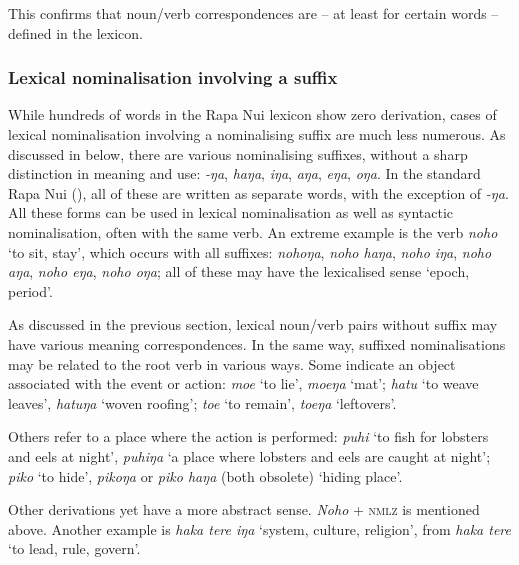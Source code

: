 This confirms that noun/verb correspondences are – at least for certain words – defined in the lexicon. 

\subsubsection[Lexical nominalisation involving a suffix]{Lexical nominalisation involving a suffix}\label{sec:3.2.2.2}
While hundreds of words in the Rapa Nui lexicon show zero derivation, cases of lexical nominalisation involving a nominalising suffix are much less numerous. As discussed in  below, there are various nominalising suffixes, without a sharp distinction in meaning and use: \textit{-ŋa}, \textit{haŋa}, \textit{iŋa}, \textit{aŋa}, \textit{eŋa}, \textit{oŋa}. In the standard Rapa Nui  (), all of these are written as separate words, with the exception of \textit{-ŋa}. All these forms can be used in lexical nominalisation as well as syntactic nominalisation, often with the same verb. An extreme example is the verb \textit{noho} ‘to sit, stay’, which occurs with all suffixes: \textit{nohoŋa}, \textit{noho haŋa}, \textit{noho iŋa}, \textit{noho aŋa}, \textit{noho eŋa}, \textit{noho oŋa}; all of these may have the lexicalised sense ‘epoch, period’.

As discussed in the previous section, lexical noun/verb pairs without suffix may have various meaning correspondences. In the same way, suffixed nominalisations may be related to the root verb in various ways. Some indicate an object associated with the event or action: \textit{moe} ‘to lie’, \textit{moeŋa} ‘mat’; \textit{hatu} ‘to weave leaves’, \textit{hatuŋa} ‘woven roofing’; \textit{toe} ‘to remain’, \textit{toeŋa} ‘leftovers’.

Others refer to a place where the action is performed: \textit{puhi} ‘to fish for lobsters and eels at night’, \textit{puhiŋa} ‘a place where lobsters and eels are caught at night’; \textit{piko} ‘to hide’, \textit{pikoŋa} or \textit{piko haŋa} (both obsolete) ‘hiding place’. 

Other derivations yet have a more abstract sense. \textit{Noho} + \textsc{nmlz} is mentioned above. Another example is \textit{haka tere iŋa} ‘system, culture, religion’, from \textit{haka tere} ‘to lead, rule, govern’. 


